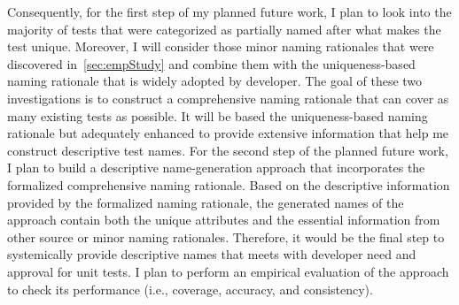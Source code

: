 Consequently, for the first step of my planned future work, I plan to look into the majority of tests that were categorized as partially named after what makes the test unique.
%
Moreover, I will consider those minor naming rationales that were discovered in~\cref{sec:empStudy} and combine them with the uniqueness-based naming rationale that is widely adopted by developer.
%
The goal of these two investigations is to construct a comprehensive naming rationale that can cover as many existing tests as possible.
%
It will be based the uniqueness-based naming rationale but adequately enhanced to provide extensive information that help me construct descriptive test names.
%
For the second step of the planned future work, I plan to build a descriptive name-generation approach that incorporates the formalized comprehensive naming rationale.
%
Based on the descriptive information provided by the formalized naming rationale, the generated names of the approach contain both the unique attributes and the essential information from other source or minor naming rationales.
%
Therefore, it would be the final step to systemically provide descriptive names that meets with developer need and approval for unit tests.
%
I plan to perform an empirical evaluation of the approach to check its performance (i.e., coverage, accuracy, and consistency).
